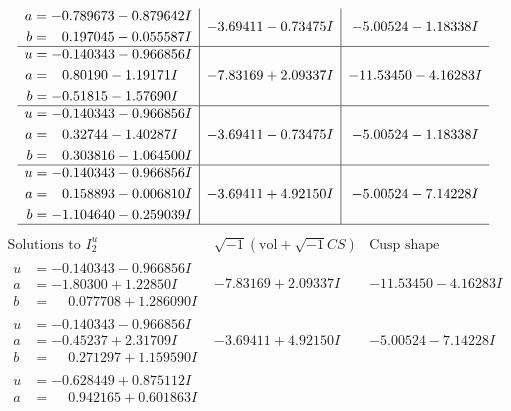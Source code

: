 \documentclass[1p]{elsarticle_modified}
\theoremstyle{definition}
\newcommand{\I}{\sqrt{-1}}
\begin{document}
$$\begin{array}{c|c|c}
\begin{aligned}
a &= -0.789673 - 0.879642 I \\
b &= \phantom{-}0.197045 - 0.055587 I\end{aligned}
 & -3.69411 - 0.73475 I & -5.00524 - 1.18338 I \\ \hline\begin{aligned}
u &= -0.140343 - 0.966856 I \\
a &= \phantom{-}0.80190 - 1.19171 I \\
b &= -0.51815 - 1.57690 I\end{aligned}
 & -7.83169 + 2.09337 I & -11.53450 - 4.16283 I \\ \hline\begin{aligned}
u &= -0.140343 - 0.966856 I \\
a &= \phantom{-}0.32744 - 1.40287 I \\
b &= \phantom{-}0.303816 - 1.064500 I\end{aligned}
 & -3.69411 - 0.73475 I & -5.00524 - 1.18338 I \\ \hline\begin{aligned}
u &= -0.140343 - 0.966856 I \\
a &= \phantom{-}0.158893 - 0.006810 I \\
b &= -1.104640 - 0.259039 I\end{aligned}
 & -3.69411 + 4.92150 I & -5.00524 - 7.14228 I\\
 \hline 
 \end{array}$$\newpage$$\begin{array}{c|c|c}  
\text{Solutions to }I^u_{2}& \I (\text{vol} + \sqrt{-1}CS) & \text{Cusp shape}\\
 \hline 
\begin{aligned}
u &= -0.140343 - 0.966856 I \\
a &= -1.80300 + 1.22850 I \\
b &= \phantom{-}0.077708 + 1.286090 I\end{aligned}
 & -7.83169 + 2.09337 I & -11.53450 - 4.16283 I \\ \hline\begin{aligned}
u &= -0.140343 - 0.966856 I \\
a &= -0.45237 + 2.31709 I \\
b &= \phantom{-}0.271297 + 1.159590 I\end{aligned}
 & -3.69411 + 4.92150 I & -5.00524 - 7.14228 I \\ \hline\begin{aligned}
u &= -0.628449 + 0.875112 I \\
a &= \phantom{-}0.942165 + 0.601863 I \\

\end{aligned}
\end{array}$$
\end{document}
